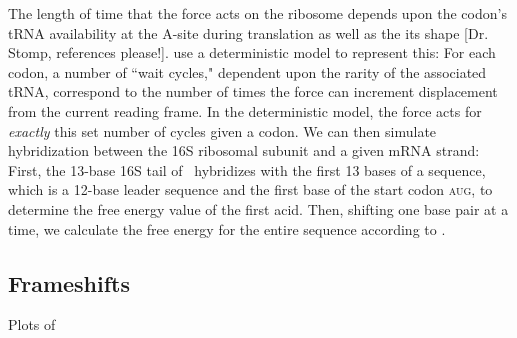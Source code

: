 \documentclass[12pt, draft]{article}
\numberwithin{equation}{section}
\begin{document}
The length of time that the force acts on the ribosome depends upon
the codon's tRNA availability at the A-site during translation as well as the its shape [Dr. Stomp, references please!].
\citeauthor{lalit:mechanics} use a deterministic model to represent this: For each codon,
a number of ``wait cycles," dependent upon the rarity of the
associated tRNA, correspond to the number of times the force can
increment displacement from the current reading frame.  In the
deterministic model, the force acts for \emph{exactly} this set number
of cycles given a codon. We can then simulate hybridization between the
16S ribosomal subunit and a given mRNA strand: First, the 13-base 16S
tail of \ecoli\ hybridizes with the first 13 bases of a sequence,
which is a 12-base leader sequence and the first base of the start
codon \textsc{aug}, to determine the free energy value of the first acid.
Then, shifting one base pair at a time, we calculate the free energy
for the entire sequence according to \citet{starmer}.

\subsection{Frameshifts}
\label{section:frameshifts}

\begin{cfigure}
  \caption{Plots of~\prfB}
  \label{prfB:detplots}
\end{cfigure}
\end{document}
